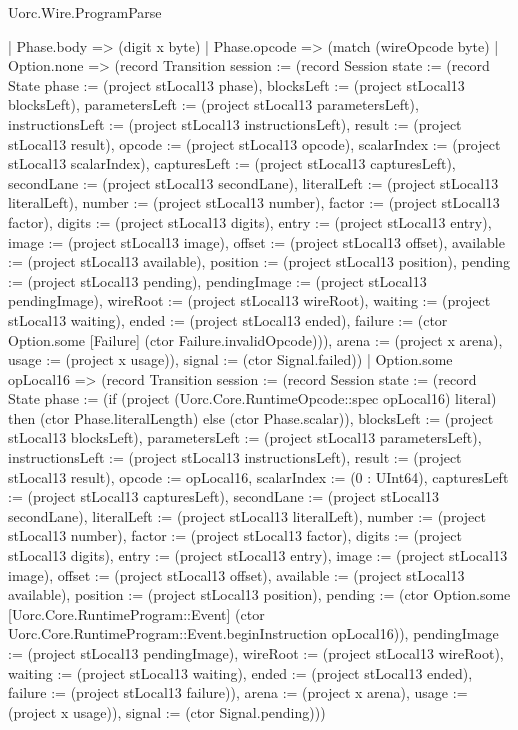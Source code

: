 \begin{lexlean}{Uorc.Wire.ProgramParse}
\begin{semanticmodule}
{    | Phase.body => (digit x byte)
    | Phase.opcode => (match (wireOpcode byte)
      | Option.none => (record Transition {session := (record Session {state := (record State {phase := (project stLocal13 phase), blocksLeft := (project stLocal13 blocksLeft), parametersLeft := (project stLocal13 parametersLeft), instructionsLeft := (project stLocal13 instructionsLeft), result := (project stLocal13 result), opcode := (project stLocal13 opcode), scalarIndex := (project stLocal13 scalarIndex), capturesLeft := (project stLocal13 capturesLeft), secondLane := (project stLocal13 secondLane), literalLeft := (project stLocal13 literalLeft), number := (project stLocal13 number), factor := (project stLocal13 factor), digits := (project stLocal13 digits), entry := (project stLocal13 entry), image := (project stLocal13 image), offset := (project stLocal13 offset), available := (project stLocal13 available), position := (project stLocal13 position), pending := (project stLocal13 pending), pendingImage := (project stLocal13 pendingImage), wireRoot := (project stLocal13 wireRoot), waiting := (project stLocal13 waiting), ended := (project stLocal13 ended), failure := (ctor Option.some [Failure] (ctor Failure.invalidOpcode))}), arena := (project x arena), usage := (project x usage)}), signal := (ctor Signal.failed)})
      | Option.some opLocal16 => (record Transition {session := (record Session {state := (record State {phase := (if (project (Uorc.Core.RuntimeOpcode::spec opLocal16) literal) then (ctor Phase.literalLength) else (ctor Phase.scalar)), blocksLeft := (project stLocal13 blocksLeft), parametersLeft := (project stLocal13 parametersLeft), instructionsLeft := (project stLocal13 instructionsLeft), result := (project stLocal13 result), opcode := opLocal16, scalarIndex := (0 : UInt64), capturesLeft := (project stLocal13 capturesLeft), secondLane := (project stLocal13 secondLane), literalLeft := (project stLocal13 literalLeft), number := (project stLocal13 number), factor := (project stLocal13 factor), digits := (project stLocal13 digits), entry := (project stLocal13 entry), image := (project stLocal13 image), offset := (project stLocal13 offset), available := (project stLocal13 available), position := (project stLocal13 position), pending := (ctor Option.some [Uorc.Core.RuntimeProgram::Event] (ctor Uorc.Core.RuntimeProgram::Event.beginInstruction opLocal16)), pendingImage := (project stLocal13 pendingImage), wireRoot := (project stLocal13 wireRoot), waiting := (project stLocal13 waiting), ended := (project stLocal13 ended), failure := (project stLocal13 failure)}), arena := (project x arena), usage := (project x usage)}), signal := (ctor Signal.pending)}))
}
\end{semanticmodule}
\end{lexlean}
